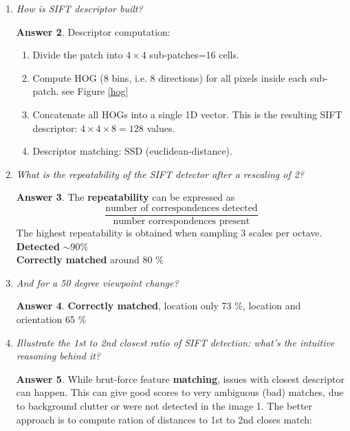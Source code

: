 \documentclass[a4paper,12 pt]{article}
\theoremstyle{definition}
\theoremstyle{remark}
\theoremstyle{definition}
\theoremstyle{definition}
\theoremstyle{definition}
\theoremstyle{definition}
\theoremstyle{remark}
\theoremstyle{remark}
\theoremstyle{definition}
\theoremstyle{definition}
\newtheorem*{answer}{Answer}
\begin{document}
\begin{enumerate}
\begin{enumerate}
\begin{answer}
\begin{enumerate}
\item all the properties of the keypoint will be measured relative to the keypoint orientation
\end{enumerate}
\end{answer}
\item \textit{How is SIFT descriptor built?}
\begin{answer}
Descriptor computation:
\begin{enumerate}
\item Divide the patch into $4\times4$ sub-patches=16 cells.
\item Compute HOG (8 bins, i.e. 8 directions) for all pixels inside each sub-patch. see Figure \ref{hog}
\item Concatenate all HOGs into a single 1D vector. This is the resulting SIFT descriptor: $4\times 4 \times 8=128$ values.
\item Descriptor matching: SSD (euclidean-distance).
\end{enumerate}
\end{answer}
\item \textit{What is the repeatability of the SIFT detector after a rescaling of 2? }
\begin{answer}
The \textbf{repeatability} can be expressed as
\begin{equation}
\frac{\text{number of correspondences detected}}{\text{number correspondences present}}
\end{equation}
The highest repeatability is obtained when sampling 3 scales per octave.\\
\textbf{Detected} $\sim 90 \%$\\
\textbf{Correctly matched } around 80 $\%$
\end{answer}
\item \textit{ And for a 50 degree viewpoint change?}
\begin{answer}
\textbf{Correctly matched}, location only 73 $\%$, location and orientation 65 $\%$
\end{answer}
\item \textit{Illustrate the 1st to 2nd closest ratio of SIFT detection: what’s the intuitive reasoning behind it?}
\begin{answer}
While brut-force feature \textbf{matching}, issues with closest descriptor can happen. This can give good scores to very ambiguous (bad) matches, due to background clutter or were not detected in the image 1.  The better approach is to compute ration of distances to 1st to 2nd closes match:
\begin{equation}

\end{equation}
\end{answer}
\end{enumerate}
\end{enumerate}
\end{document}
